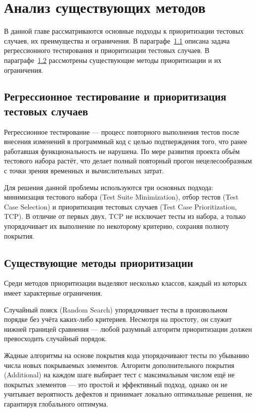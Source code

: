 \chapter{Анализ существующих методов} \label{ch1}

В данной главе рассматриваются основные подходы к приоритизации тестовых случаев, их преимущества и ограничения. 
В параграфе~\ref{ch1:sec1} описана задача регрессионного тестирования и приоритизации тестовых случаев.
В параграфе~\ref{ch1:sec2} рассмотрены существующие методы приоритизации и их ограничения.

\section{Регрессионное тестирование и приоритизация тестовых случаев} 
\label{ch1:sec1}

Регрессионное тестирование --- процесс повторного выполнения тестов после внесения изменений в программный код с 
целью подтверждения того, что ранее работавшая функциональность не нарушена. По мере развития проекта объём 
тестового набора растёт, что делает полный повторный прогон нецелесообразным с точки зрения временных и 
вычислительных затрат.

Для решения данной проблемы используются три основных подхода: минимизация тестового набора (Test Suite Minimization), 
отбор тестов (Test Case Selection) и приоритизация тестовых случаев (Test Case Prioritization, TCP). 
В отличие от первых двух, TCP не исключает тесты из набора, а только упорядочивает их выполнение по некоторому 
критерию, сохраняя полноту покрытия.

\section{Существующие методы приоритизации}\label{ch1:sec2}

Среди методов приоритизации выделяют несколько классов, каждый из которых имеет характерные ограничения.

Случайный поиск (Random Search) упорядочивает тесты в произвольном порядке без учёта каких-либо критериев. 
Несмотря на простоту, он служит нижней границей сравнения --- любой разумный алгоритм приоритизации должен 
превосходить случайный порядок.

Жадные алгоритмы на основе покрытия кода упорядочивают тесты по убыванию числа новых покрываемых элементов. 
Алгоритм дополнительного покрытия (Additional) на каждом шаге выбирает тест с максимальным числом ещё не покрытых
элементов --- это простой и эффективный подход, однако он не учитывает вероятность дефектов и принимает локально 
оптимальные решения, не гарантируя глобального оптимума.

